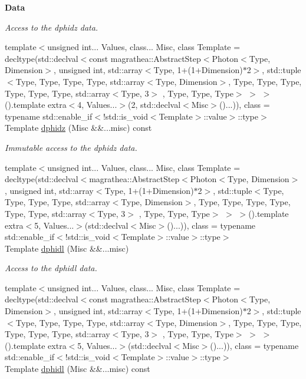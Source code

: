 \begin{Indent}{\bf Data}
\begin{DoxyCompactItemize}
\begin{DoxyCompactList}\small\item\em Access to the dphidz data. \end{DoxyCompactList}\item 
{\footnotesize template$<$unsigned int... Values, class... Misc, class Template  = decltype(std\-::declval$<$const magrathea\-::\-Abstract\-Step$<$\-Photon$<$\-Type, Dimension$>$, unsigned int, std\-::array$<$\-Type, 1+(1+\-Dimension)$\ast$2$>$, std\-::tuple$<$\-Type, Type, Type, Type, std\-::array$<$\-Type, Dimension$>$, Type, Type, Type, Type, Type, Type, std\-::array$<$\-Type, 3$>$ , Type, Type, Type$>$ $>$ $>$().\-template extra$<$4, Values...$>$(2, std\-::declval$<$\-Misc$>$()...)), class  = typename std\-::enable\-\_\-if$<$!std\-::is\-\_\-void$<$\-Template$>$\-::value$>$\-::type$>$ }\\Template \hyperlink{exceptionPhoton_a9cc3531a0e5952dc183b189ad594b693}{dphidz} (Misc \&\&...misc) const 
\begin{DoxyCompactList}\small\item\em Immutable access to the dphidz data. \end{DoxyCompactList}\item 
{\footnotesize template$<$unsigned int... Values, class... Misc, class Template  = decltype(std\-::declval$<$magrathea\-::\-Abstract\-Step$<$\-Photon$<$\-Type, Dimension$>$, unsigned int, std\-::array$<$\-Type, 1+(1+\-Dimension)$\ast$2$>$, std\-::tuple$<$\-Type, Type, Type, Type, std\-::array$<$\-Type, Dimension$>$, Type, Type, Type, Type, Type, Type, std\-::array$<$\-Type, 3$>$ , Type, Type, Type$>$ $>$ $>$().\-template extra$<$5, Values...$>$(std\-::declval$<$\-Misc$>$()...)), class  = typename std\-::enable\-\_\-if$<$!std\-::is\-\_\-void$<$\-Template$>$\-::value$>$\-::type$>$ }\\Template \hyperlink{exceptionPhoton_a26f5b776e4f150427e7cacd2fd0cb0f9}{dphidl} (Misc \&\&...misc)
\begin{DoxyCompactList}\small\item\em Access to the dphidl data. \end{DoxyCompactList}\item 
{\footnotesize template$<$unsigned int... Values, class... Misc, class Template  = decltype(std\-::declval$<$const magrathea\-::\-Abstract\-Step$<$\-Photon$<$\-Type, Dimension$>$, unsigned int, std\-::array$<$\-Type, 1+(1+\-Dimension)$\ast$2$>$, std\-::tuple$<$\-Type, Type, Type, Type, std\-::array$<$\-Type, Dimension$>$, Type, Type, Type, Type, Type, Type, std\-::array$<$\-Type, 3$>$ , Type, Type, Type$>$ $>$ $>$().\-template extra$<$5, Values...$>$(std\-::declval$<$\-Misc$>$()...)), class  = typename std\-::enable\-\_\-if$<$!std\-::is\-\_\-void$<$\-Template$>$\-::value$>$\-::type$>$ }\\Template \hyperlink{exceptionPhoton_adda0f76ac18226a5c0fc0a777e58ece0}{dphidl} (Misc \&\&...misc) const 

\end{DoxyCompactItemize}
\end{Indent}
